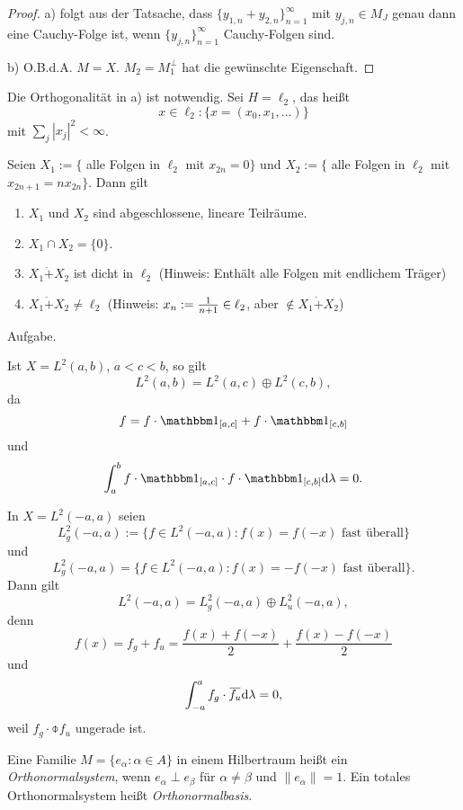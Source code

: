 \begin{proof}
  a) folgt aus der Tatsache, dass $\{ y_{1,n} + y_{2,n} \}_{n=1}^\infty$ mit
  $y_{j,n} \in M_J$ genau dann eine Cauchy-Folge ist, wenn
  $\{y_{j,n}\}_{n=1}^\infty$ Cauchy-Folgen sind.

  b) O.B.d.A. $M = X$. $M_2 = M_1^\perp$ hat die gewünschte Eigenschaft.
\end{proof}

\begin{rmrk*}
  Die Orthogonalität in a) ist notwendig. Sei $H = \ell_2$, das heißt
  \[ x \in \ell_2 : \{ x = (x_0, x_1, \ldots ) \} \]
  mit $\sum_j |x_j|^2 < \infty$.

  Seien $X_1 := \{$ alle Folgen in $\ell_2$ mit $ x_{2n} = 0\}$ und $X_2 := \{$
  alle Folgen in $\ell_2$ mit $x_{2n+1} = n x_{2n} \}$. Dann gilt
  \begin{enumerate}
  \item $X_1$ und $X_2$ sind abgeschlossene, lineare Teilräume.
  \item $X_1 \cap X_2 = \{ 0 \}$.
  \item $X_1 \dot{+} X_2$ ist dicht in $\ell_2$ (Hinweis: Enthält alle Folgen
    mit endlichem Träger)
  \item $X_1 \dot{+} X_2 \ne \ell_2$ (Hinweis: $x_n := \frac{1}{n+1} \in \ell_2$,
    aber $\notin X_1 \dot{+} X_2$)
  \end{enumerate}
  Aufgabe.
\end{rmrk*}

\begin{exmp}
  Ist $X = L^2(a,b)$, $a < c < b$, so gilt
  \[ L^2(a,b) = L^2(a,c) \oplus L^2(c,b), \]
  da
  \[ f = f \cdot \ind_{[a,c]} + f \cdot \ind_{[c,b]} \]
  und
  \[ \int_a^b f \cdot \ind_{[a,c]} \cdot f \cdot \ind_{[c,b]} \diffop \lambda =
    0. \]
\end{exmp}

\begin{exmp}
  In $X = L^2(-a,a)$ seien
  \[ L_g^2(-a,a) := \{ f \in L^2(-a,a) :
    f(x) = f(-x) \text{ fast überall} \} \]
  und
  \[ L_g^2(-a,a) = \{ f \in L^2(-a,a) :
    f(x) = -f(-x) \text{ fast überall} \}. \]
  Dann gilt
  \[ L^2(-a,a) = L^2_g(-a,a) \oplus L^2_u(-a,a), \]
  denn
  \[ f(x) = f_g + f_u = \frac{f(x) + f(-x)}{2} + \frac{f(x) - f(-x)}{2} \]
  und
  \[ \int_{-a}^a f_g \cdot \obar{f_u} \diffop \lambda = 0, \]
  weil $f_g \cdot \obar{f_u}$ ungerade ist.
\end{exmp}

Eine Familie $M = \{ e_\alpha : \alpha \in A \}$ in einem Hilbertraum heißt ein
\emph{Orthonormalsystem}, wenn $e_\alpha \perp e_\beta$ für $\alpha \ne \beta$
und $\| e_\alpha \| = 1$. Ein totales Orthonormalsystem heißt
\emph{Orthonormalbasis}.

